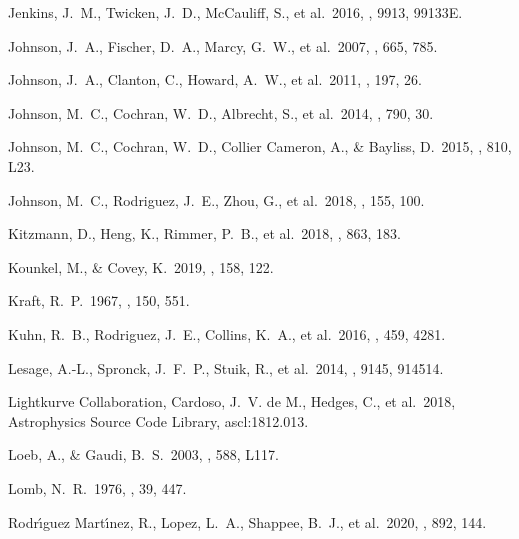  Jenkins, J.~M., Twicken, J.~D., McCauliff, S., et al.\ 2016, \procspie, 9913, 99133E.

 Johnson, J.~A., Fischer, D.~A., Marcy, G.~W., et al.\ 2007, \apj, 665, 785.

 Johnson, J.~A., Clanton, C., Howard, A.~W., et al.\ 2011, \apjs, 197, 26.

 Johnson, M.~C., Cochran, W.~D., Albrecht, S., et al.\ 2014, \apj, 790, 30.

 Johnson, M.~C., Cochran, W.~D., Collier Cameron, A., \& Bayliss, D.\ 2015, \apjl, 810, L23.

 Johnson, M.~C., Rodriguez, J.~E., Zhou, G., et al.\ 2018, \aj, 155, 100.

 Kitzmann, D., Heng, K., Rimmer, P.~B., et al.\ 2018, \apj, 863, 183.

 Kounkel, M., \& Covey, K.\ 2019, \aj, 158, 122.


 Kraft, R.~P.\ 1967, \apj, 150, 551.

 Kuhn, R.~B., Rodriguez, J.~E., Collins, K.~A., et al.\ 2016, \mnras, 459, 4281.

 Lesage, A.-L., Spronck, J.~F.~P., Stuik, R., et al.\ 2014, \procspie, 9145, 914514.

 Lightkurve Collaboration, Cardoso, J.~V. de M., Hedges, C., et al.\ 2018, Astrophysics Source Code Library, ascl:1812.013.

 Loeb, A., \& Gaudi, B.~S.\ 2003, \apjl, 588, L117.

 Lomb, N.~R.\ 1976, \apss, 39, 447.


 Rodr{\'\i}guez Mart{\'\i}nez, R., Lopez, L.~A., Shappee, B.~J., et al.\ 2020, \apj, 892, 144.



